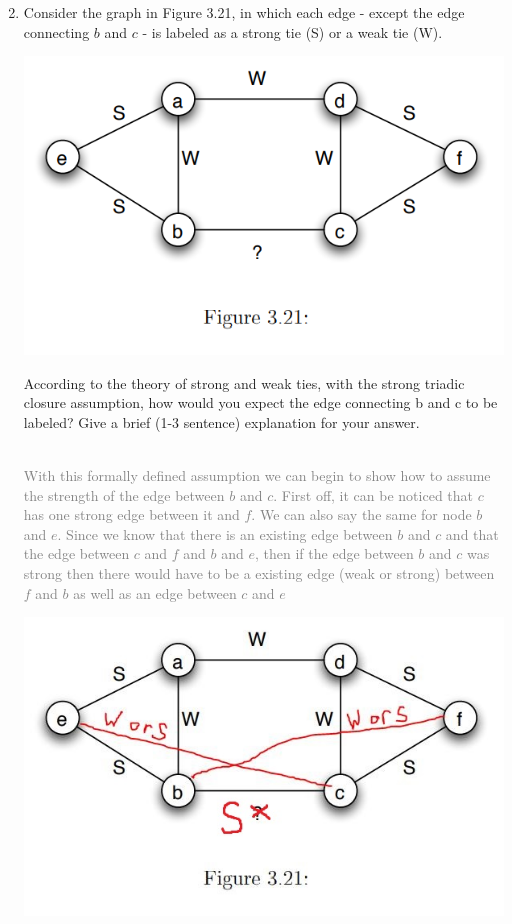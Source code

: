 \documentclass[11pt]{article}
\begin{document}
\begin{enumerate}
\setcounter{enumi}{1}
\item Consider the graph in Figure 3.21, in which each edge - except the edge connecting $b$ and $c$ - is labeled as a strong tie (S) or a weak tie (W).\\
\begin{center}
	\includegraphics[scale=0.6]{Figure_3_21}
\end{center}
According to the theory of strong and weak ties, with the strong triadic closure assumption, how would you expect the edge connecting b and c to be labeled? Give a brief (1-3 sentence) explanation for your answer.\\\\
\textcolor{gray}{
With this formally defined assumption we can begin to show how to assume the strength of the edge between $b$ and $c$.  First off, it can be noticed that $c$ has one strong edge between it and $f$. We can also say the same for node $b$ and $e$.  Since we know that there is an existing edge between $b$ and $c$ and that the edge between $c$ and $f$ and $b$ and $e$, then if the edge between $b$ and $c$ was strong then there would have to be a existing edge (weak or strong) between $f$ and $b$ as well as an edge between $c$ and $e$\\
\begin{center}
	\includegraphics[scale=0.6]{Figure_3_21_Answer}

\end{center}}
\end{enumerate}
\end{document}
